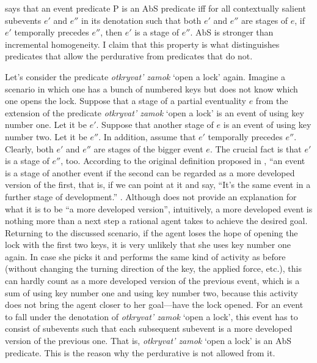 \documentclass[output=paper,
]{langscibook}
\begin{document}
\noindent {} says that an event predicate P is an AbS predicate iff for all contextually salient subevents $e'$ and $e''$ in its denotation such that both $e'$ and $e''$ are stages of $e$, if $e'$ temporally precedes $e''$, then $e'$ is a stage of $e''$. AbS is stronger than incremental homogeneity. I claim that this property is what distinguishes predicates that allow the perdurative from predicates that do not. 

Let’s consider the predicate \textit{otkryvat’ zamok} `open a lock' again. Imagine a scenario in which one has a bunch of numbered keys but does not know which one opens the lock. Suppose that a stage of a partial eventuality $e$ from the extension of the predicate \textit{otkryvat’ zamok} `open a lock' is an event of using key number one. Let it be $e'$. Suppose that another stage of $e$ is an event of using key number two. Let it be $e''$. In addition, assume that $e'$ temporally precedes $e''$. Clearly, both $e'$ and $e''$ are stages of the bigger event $e$. The crucial fact is that $e'$ is a stage of $e''$, too. According to the original definition proposed in \citet{landman1992progressive}, ``an event is a stage of another event if the second can be regarded as a more developed version of the first, that is, if we can point at it and say, ``It's the same event in a further stage of development.'' \citep[23]{landman1992progressive}. Although \citet{landman1992progressive} does not provide an explanation for what it is to be ``a more developed version'', intuitively, a more developed event is nothing more than a next step a rational agent takes to achieve the desired goal. Returning to the discussed scenario, if the agent loses the hope of opening the lock with the first two keys, it is very unlikely that she uses key number one again. In case she picks it and performs the same kind of activity as before (without changing the turning direction of the key, the applied force, etc.), this can hardly count as a more developed version of the previous event, which is a sum of using key number one and using key number two, because this activity does not bring the agent closer to her goal—have the lock opened. For an event to fall under the denotation of \textit{otkryvat’ zamok} `open a lock', this event has to consist of subevents such that each subsequent subevent is a more developed version of the previous one. That is, \textit{otkryvat’ zamok} `open a lock' is an AbS predicate. This is the reason why the perdurative is not allowed from it.
\end{document}
